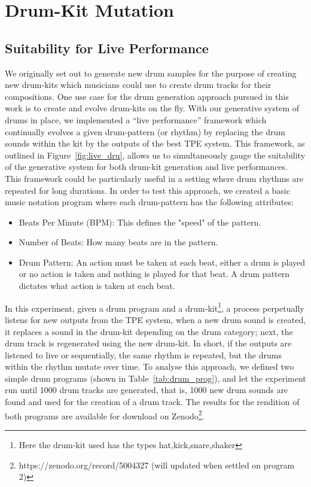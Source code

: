 \documentclass[\main/thesis.tex]{subfiles}
\begin{document}
\chapter{Drum-Kit Mutation}
\section{Suitability for Live Performance}
We originally set out to generate new drum samples for the purpose of creating new drum-kits which musicians could use to create drum tracks for their compositions. One use case for the drum generation approach pursued in this work is to create and evolve drum-kits on the fly. With our generative system of drums in place, we implemented a \enquote{live performance} framework which continually evolves a given drum-pattern (or rhythm) by replacing the drum sounds within the kit by the outputs of the best TPE system. This framework, as outlined in Figure~\ref{fig:live_dru}, allows us to simultaneously gauge the suitability of the generative system for both drum-kit generation and live performances. This framework could be particularly useful in a setting where drum rhythms are repeated for long durations. In order to test this approach, we created a basic music notation program where each drum-pattern has the following attributes:

\begin{itemize}
    \item Beats Per Minute (BPM): This defines the "speed" of the pattern. 
    \item Number of Beats: How many beats are in the pattern.
    \item Drum Pattern: An action must be taken at each beat, either a drum is played or no action is taken and nothing is played for that beat. A drum pattern dictates what action is taken at each beat.
\end{itemize}

In this experiment, given a drum program and a drum-kit\footnote{Here the drum-kit used has the types hat,kick,snare,shaker}, a process perpetually listens for new outputs from the TPE system, when a new drum sound is created, it replaces a sound in the drum-kit depending on the drum category; next, the drum track is regenerated using the new drum-kit. In short, if the outputs are listened to live or sequentially, the same rhythm is repeated, but the drums within the rhythm mutate over time. To analyse this approach, we defined two simple drum programs (shown in Table~\ref{tab:drum_prog}), and let the experiment run until 1000 drum tracks are generated, that is, 1000 new drum sounds are found and used for the creation of a drum track. The results for the rendition of both programs are available for download on Zenodo\footnote{https://zenodo.org/record/5004327  (will updated when settled on program 2)}. 
\end{document}
